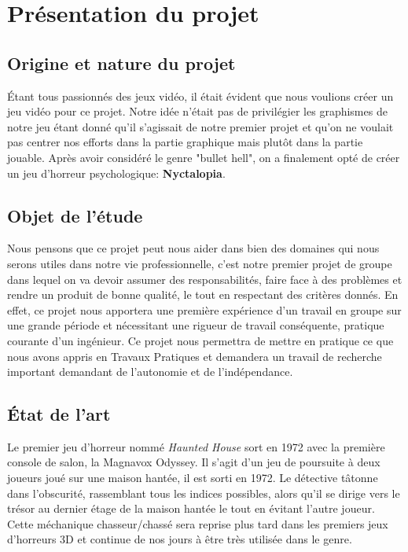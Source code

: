 \section{Présentation du projet}

\subsection{Origine et nature du projet }
\setlength{\parindent}{5ex}
Étant tous passionnés des jeux vidéo, il était évident que nous voulions créer un jeu vidéo pour ce projet. Notre idée n'était pas de privilégier les graphismes de notre jeu étant donné qu'il s'agissait de notre premier projet et qu'on ne voulait pas centrer nos efforts dans la partie graphique mais plutôt dans la partie jouable. Après avoir considéré le genre "bullet hell", on a finalement opté de créer un jeu d'horreur psychologique: \textbf{Nyctalopia}.

\subsection{Objet de l’étude}
\setlength{\parindent}{5ex}
Nous pensons que ce projet peut nous aider dans bien des domaines qui nous serons utiles dans notre vie professionnelle, c'est notre premier projet de groupe dans lequel on va devoir assumer des responsabilités, faire face à des problèmes et rendre un produit de bonne qualité, le tout en respectant des critères donnés.
\newline\indent
En effet, ce projet nous apportera une première expérience d'un travail en groupe sur une grande période et nécessitant une rigueur de travail conséquente, pratique courante d'un ingénieur.
\newline\indent
Ce projet nous permettra de mettre en pratique ce que nous avons appris en Travaux Pratiques et demandera un travail de recherche important demandant de l'autonomie et de l'indépendance.


\subsection{État de l’art}
\setlength{\parindent}{5ex}
Le premier jeu d'horreur nommé \emph{Haunted House} sort en 1972 avec la première console de salon, la Magnavox Odyssey. Il s'agit d'un jeu de poursuite à deux joueurs joué sur une maison hantée, il est sorti en 1972. Le détective tâtonne dans l'obscurité, rassemblant tous les indices possibles, alors qu'il se dirige vers le trésor au dernier étage de la maison hantée le tout en évitant l'autre joueur. Cette méchanique chasseur/chassé sera reprise plus tard dans les premiers jeux d'horreurs 3D et continue de nos jours à être très utilisée dans le genre.


